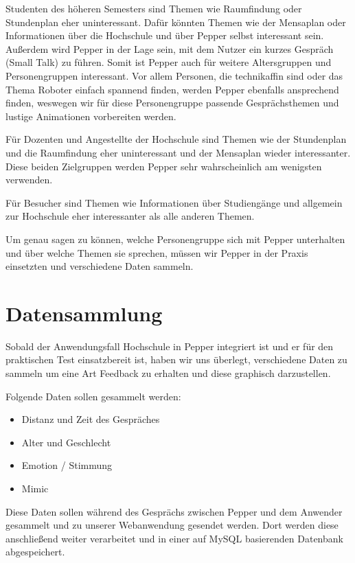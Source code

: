 Studenten des höheren Semesters sind Themen wie Raumfindung oder Stundenplan eher uninteressant. Dafür könnten Themen wie der Mensaplan oder Informationen über die Hochschule und über Pepper selbst interessant sein. Außerdem wird Pepper in der Lage sein, mit dem Nutzer ein kurzes Gespräch (Small Talk) zu führen. Somit ist Pepper auch für weitere Altersgruppen und Personengruppen interessant. Vor allem Personen, die technikaffin sind oder das Thema Roboter einfach spannend finden, werden Pepper ebenfalls ansprechend finden, weswegen wir für diese Personengruppe passende Gesprächsthemen und lustige Animationen vorbereiten werden.

Für Dozenten und Angestellte der Hochschule sind Themen wie der Stundenplan und die Raumfindung eher uninteressant und der Mensaplan wieder interessanter. Diese beiden Zielgruppen werden Pepper sehr wahrscheinlich am wenigsten verwenden.

Für Besucher sind Themen wie Informationen über Studiengänge und allgemein zur Hochschule eher interessanter als alle anderen Themen.

Um genau sagen zu können, welche Personengruppe sich mit Pepper unterhalten und über welche Themen sie sprechen, müssen wir Pepper in der Praxis einsetzten und verschiedene Daten sammeln.\\


\section{Datensammlung}
Sobald der Anwendungsfall Hochschule in Pepper integriert ist und er für den praktischen Test einsatzbereit ist, haben wir uns überlegt, verschiedene Daten zu sammeln um eine Art Feedback zu erhalten und diese graphisch darzustellen.

Folgende Daten sollen gesammelt werden:
\begin{itemize}
    \item Distanz und Zeit des Gespräches
    \item Alter und Geschlecht
    \item Emotion / Stimmung
    \item Mimic
\end{itemize}

Diese Daten sollen während des Gesprächs zwischen Pepper und dem Anwender gesammelt und zu unserer Webanwendung gesendet werden. Dort werden diese anschließend weiter verarbeitet und in einer auf MySQL basierenden Datenbank abgespeichert.

